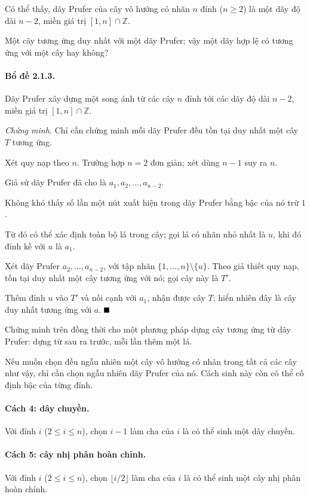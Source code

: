\documentclass[11pt]{article}
\providecommand{\square}{\mathord{\vcenter{\hrule height .6em width .6em}}}
\begin{document}
Có thể thấy, dãy Prufer của cây vô hướng có nhãn $n$ đỉnh ($n\ge 2$) là một
dãy độ dài $n-2$, miền giá trị $[1,n]\cap\mathbb{Z}$.

Một cây tương ứng duy nhất với một dãy Prufer; vậy một dãy hợp lệ có tương ứng
với một cây hay không?

\paragraph{Bổ đề 2.1.3.}
Dãy Prufer xây dựng một song ánh từ các cây $n$ đỉnh tới các dãy độ dài $n-2$,
miền giá trị $[1,n]\cap\mathbb{Z}$.

\emph{Chứng minh.}
Chỉ cần chứng minh mỗi dãy Prufer đều tồn tại duy nhất một cây $T$ tương ứng.

Xét quy nạp theo $n$. Trường hợp $n=2$ đơn giản; xét dùng $n-1$ suy ra $n$.

Giả sử dãy Prufer đã cho là $a_1,a_2,\ldots,a_{n-2}$.

Không khó thấy số lần một nút xuất hiện trong dãy Prufer bằng bậc của nó trừ
$1$.

Từ đó có thể xác định toàn bộ lá trong cây; gọi lá có nhãn nhỏ nhất là $u$, khi
đó đỉnh kề với $u$ là $a_1$.

Xét dãy Prufer $a_2,\ldots,a_{n-2}$, với tập nhãn
$\{1,\ldots,n\}\setminus\{u\}$. Theo giả thiết quy nạp, tồn tại duy nhất một cây
tương ứng với nó; gọi cây này là $T'$.

Thêm đỉnh $u$ vào $T'$ và nối cạnh với $a_1$, nhận được cây $T$; hiển nhiên đây
là cây duy nhất tương ứng với $a$. \hfill$\square$

Chứng minh trên đồng thời cho một phương pháp dựng cây tương ứng từ dãy Prufer:
dựng từ sau ra trước, mỗi lần thêm một lá.

Nếu muốn chọn đều ngẫu nhiên một cây vô hướng có nhãn trong tất cả các cây như
vậy, chỉ cần chọn ngẫu nhiên dãy Prufer của nó. Cách sinh này còn có thể cố định
bậc của từng đỉnh.

\paragraph{Cách 4: dây chuyền.}
Với đỉnh $i$ ($2\le i\le n$), chọn $i-1$ làm cha của $i$ là có thể sinh một dây
chuyền.

\paragraph{Cách 5: cây nhị phân hoàn chỉnh.}
Với đỉnh $i$ ($2\le i\le n$), chọn $\lfloor i/2\rfloor$ làm cha của $i$ là có
thể sinh một cây nhị phân hoàn chỉnh.
\end{document}
